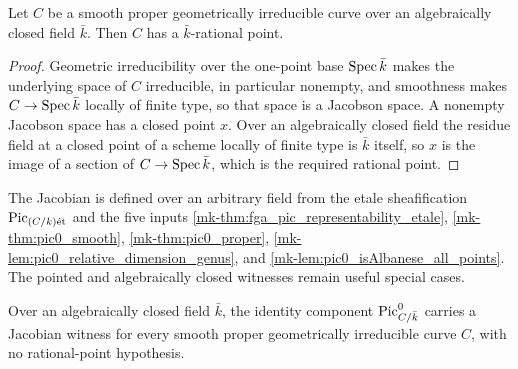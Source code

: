 \begin{lemma}
  \label{mk-lem:curve_rational_point_algClosed}
  \leanok
  Let \(C\) be a smooth proper geometrically irreducible curve over an algebraically
  closed field \(\bar k\). Then \(C\) has a \(\bar k\)-rational point.
\end{lemma}

\begin{proof}
  \leanok
  Geometric irreducibility over the one-point base \(\operatorname{Spec} \bar k\) makes the
  underlying space of \(C\) irreducible, in particular nonempty, and smoothness makes
  \(C \to \operatorname{Spec} \bar k\) locally of finite type, so that space is a Jacobson space.
  A nonempty Jacobson space has a closed point \(x\). Over an algebraically closed
  field the residue field at a closed point of a scheme locally of finite type is
  \(\bar k\) itself, so \(x\) is the image of a section of \(C \to \operatorname{Spec} \bar k\),
  which is the required rational point.
\end{proof}

\begin{remark}
  \label{mk-rem:rational_point_scope}
  The Jacobian is defined over an arbitrary field from the etale sheafification
  \(\operatorname{Pic}_{(C/k)\mathrm{\acute{e}t}}\) and the five inputs
  \ref{mk-thm:fga_pic_representability_etale}, \ref{mk-thm:pic0_smooth},
  \ref{mk-thm:pic0_proper}, \ref{mk-lem:pic0_relative_dimension_genus}, and
  \ref{mk-lem:pic0_isAlbanese_all_points}.  The pointed and algebraically closed
  witnesses remain useful special cases.
\end{remark}

\begin{theorem}
  \label{mk-def:picardJacobianWitnessOfIsAlgClosed}

  Over an algebraically closed field \(\bar k\), the identity component
  \(\operatorname{Pic}^0_{C/\bar k}\) carries a Jacobian witness for every smooth proper
  geometrically irreducible curve \(C\), with no rational-point hypothesis.
\end{theorem}

